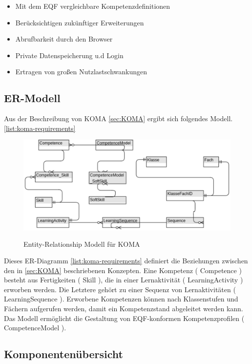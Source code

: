 \documentclass[
12pt,
english,
ngerman,
headsepline,
twoside,
openright,
numbers=noenddot,version=first
]{scrreprt}
\begin{document}
\begin{itemize}\label{list:koma-requirements}
	\item Mit dem \acrshort{EQF} vergleichbare Kompetenzdefinitionen
	\item Berücksichtigen zukünftiger Erweiterungen 
	\item Abrufbarkeit durch den Browser 
	\item Private Datenspeicherung u.d Login
	\item Ertragen von großen Nutzlastschwankungen
\end{itemize}

\subsection{ER-Modell} Aus der Beschreibung von \acrshort{KOMA} \autoref{sec:KOMA} ergibt sich folgendes Modell. \autoref{list:koma-requirements}
\begin{figure}[h]
	\centering
	\includegraphics[scale=1]{./pics/koma-er-concept.eps}
	\label{pic:koma-er-concept}
	\caption{Entity-Relationship Modell für KOMA}
\end{figure}

Dieses ER-Diagramm \autoref{list:koma-requirements}  definiert die Beziehungen zwischen den in \autoref{sec:KOMA} beschriebenen Konzepten. Eine Kompetenz ( Competence ) besteht aus Fertigkeiten ( Skill ), die in einer Lernaktivität ( LearningActivity ) erworben werden. Die Letztere gehört zu einer Sequenz von Lernaktivitäten ( LearningSequence ). Erworbene Kompetenzen können nach Klassenstufen und Fächern aufgerufen werden, damit ein Kompetenzstand abgeleitet werden kann. Das Modell ermöglicht die Gestaltung von \acrshort{EQF}-konformen Kompetenzprofilen ( CompetenceModel ).



\subsection{Komponentenübersicht}
\label{sec:components}
\end{document}
